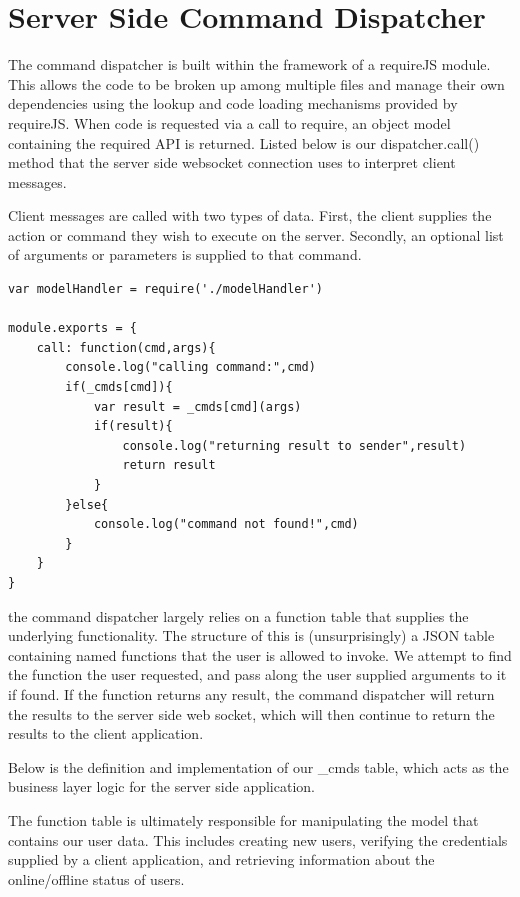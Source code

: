 \documentclass[a4paper,12pt]{report}
\begin{document}
\section{Server Side Command Dispatcher}

The command dispatcher is built within the framework of a requireJS module. This allows the code to be broken up among multiple files and manage their own dependencies using the lookup and code loading mechanisms provided by requireJS. When code is requested via a call to require, an object model containing the required API is returned. Listed below is our dispatcher.call() method that the server side websocket connection uses to interpret client messages.

Client messages are called with two types of data. First, the client supplies the action or command they wish to execute on the server. Secondly, an optional list of arguments or parameters is supplied to that command. 
\begin{lstlisting}
var modelHandler = require('./modelHandler')

module.exports = {
	call: function(cmd,args){
		console.log("calling command:",cmd)
		if(_cmds[cmd]){
			var result = _cmds[cmd](args)
			if(result){
				console.log("returning result to sender",result)
				return result
			}
		}else{
			console.log("command not found!",cmd)
		}
	}
}

\end{lstlisting}

the command dispatcher largely relies on a function table that supplies the underlying functionality. The structure of this is (unsurprisingly) a JSON table containing named functions that the user is allowed to invoke. We attempt to find the function the user requested, and pass along the user supplied arguments to it if found. If the function returns any result, the command dispatcher will return the results to the server side web socket, which will then continue to return the results to the client application.

Below is the definition and implementation of our \_cmds table, which acts as the business layer logic for the server side application.

The function table is ultimately responsible for manipulating the model that contains our user data. This includes creating new users, verifying the credentials supplied by a client application, and retrieving information about the online/offline status of users.
\end{document}
